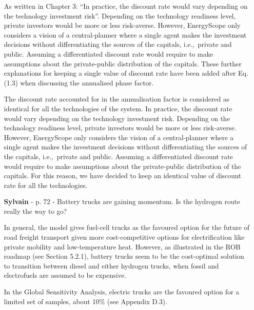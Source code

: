 \documentclass[12pt,a4paper]{article}
\def\ie{i.e.,\ }
\begin{document}
\noindent As written in Chapter 3: ``In practice, the discount rate would vary depending on the technology investment risk''. Depending on the technology readiness level, private investors would be more or less risk-averse. However, EnergyScope only considers a vision of a central-planner where a single agent makes the investment decisions without differentiating the sources of the capitals, \ie private and public. Assuming a differentiated discount rate would require to make assumptions about the private-public distribution of the capitals. These further explanations for keeping a single value of discount rate have been added {\color{blue} after Eq. (1.3) when discussing the annualised phase factor}.

\begin{mdframed}[style=manuscript] %
The discount rate accounted for in the annualisation factor is considered as identical for all the technologies of the system. In practice, the discount rate would vary depending on the technology investment risk. Depending on the technology readiness level, private investors would be more or less risk-averse. However, EnergyScope only considers the vision of a central-planner where a single agent makes the investment decisions without differentiating the sources of the capitals, \ie private and public. Assuming a differentiated discount rate would require to make assumptions about the private-public distribution of the capitals. For this reason, we have decided to keep an identical value of discount rate for all the technologies.
\end{mdframed}

\begin{mdframed}[style=comment] %
{\color{purple} \textbf{Sylvain}} - p. 72 - Battery trucks are gaining momentum. Is the hydrogen route really the way to go?
\end{mdframed}

\noindent In general, the model gives fuel-cell trucks as the favoured option for the future of road freight transport given more cost-competitive options for electrification like private mobility and low-temperature heat. However, as illustrated in the ROB roadmap (see Section 5.2.1), battery trucks seem to be the cost-optimal solution to transition between diesel and either hydrogen trucks, when fossil and electrofuels are assumed to be expensive. 

In the Global Sensitivity Analysis, electric trucks are the favoured option for a limited set of samples, about 10\% (see Appendix D.3).
\end{document}
